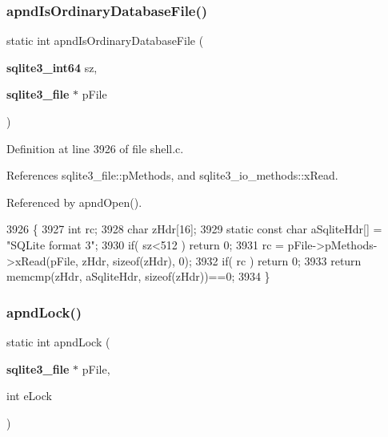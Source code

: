 \subsubsection{apnd\+Is\+Ordinary\+Database\+File()}
{\footnotesize\ttfamily static int apnd\+Is\+Ordinary\+Database\+File (\begin{DoxyParamCaption}\item[{\textbf{ sqlite3\+\_\+int64}}]{sz,  }\item[{\textbf{ sqlite3\+\_\+file} $\ast$}]{p\+File }\end{DoxyParamCaption})\hspace{0.3cm}{\ttfamily [static]}}



Definition at line 3926 of file shell.\+c.



References sqlite3\+\_\+file\+::p\+Methods, and sqlite3\+\_\+io\+\_\+methods\+::x\+Read.



Referenced by apnd\+Open().


\begin{DoxyCode}
3926                                                                             \{
3927   \textcolor{keywordtype}{int} rc;
3928   \textcolor{keywordtype}{char} zHdr[16];
3929   \textcolor{keyword}{static} \textcolor{keyword}{const} \textcolor{keywordtype}{char} aSqliteHdr[] = \textcolor{stringliteral}{"SQLite format 3"};
3930   \textcolor{keywordflow}{if}( sz<512 ) \textcolor{keywordflow}{return} 0;
3931   rc = pFile->pMethods->xRead(pFile, zHdr, \textcolor{keyword}{sizeof}(zHdr), 0);
3932   \textcolor{keywordflow}{if}( rc ) \textcolor{keywordflow}{return} 0;
3933   \textcolor{keywordflow}{return} memcmp(zHdr, aSqliteHdr, \textcolor{keyword}{sizeof}(zHdr))==0;
3934 \}
\end{DoxyCode}
\mbox{\label{shell_8c_a7ec7d9c0d514b7cc9ac9815807206b3a}} 
\subsubsection{apnd\+Lock()}
{\footnotesize\ttfamily static int apnd\+Lock (\begin{DoxyParamCaption}\item[{\textbf{ sqlite3\+\_\+file} $\ast$}]{p\+File,  }\item[{int}]{e\+Lock }\end{DoxyParamCaption})\hspace{0.3cm}{\ttfamily [static]}}



